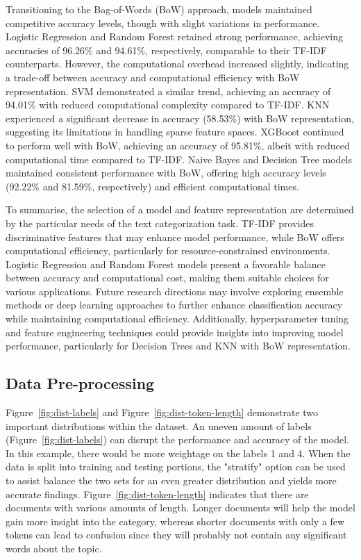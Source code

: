 Transitioning to the Bag-of-Words (BoW) approach, models maintained competitive accuracy levels, though with slight variations in performance. Logistic Regression and Random Forest retained strong performance, achieving accuracies of 96.26\% and 94.61\%, respectively, comparable to their TF-IDF counterparts. However, the computational overhead increased slightly, indicating a trade-off between accuracy and computational efficiency with BoW representation. SVM demonstrated a similar trend, achieving an accuracy of 94.01\% with reduced computational complexity compared to TF-IDF. KNN experienced a significant decrease in accuracy (58.53\%) with BoW representation, suggesting its limitations in handling sparse feature spaces. XGBoost continued to perform well with BoW, achieving an accuracy of 95.81\%, albeit with reduced computational time compared to TF-IDF. Naive Bayes and Decision Tree models maintained consistent performance with BoW, offering high accuracy levels (92.22\% and 81.59\%, respectively) and efficient computational times.

To summarise, the selection of a model and feature representation are determined by the particular needs of the text categorization task. TF-IDF provides discriminative features that may enhance model performance, while BoW offers computational efficiency, particularly for resource-constrained environments. Logistic Regression and Random Forest models present a favorable balance between accuracy and computational cost, making them suitable choices for various applications. Future research directions may involve exploring ensemble methods or deep learning approaches to further enhance classification accuracy while maintaining computational efficiency. Additionally, hyperparameter tuning and feature engineering techniques could provide insights into improving model performance, particularly for Decision Trees and KNN with BoW representation.

\subsection{Data Pre-processing}

Figure~\ref{fig:dist-labels} and Figure~\ref{fig:dist-token-length} demonstrate two important distributions within the dataset. An uneven amount of labels (Figure~\ref{fig:dist-labels}) can disrupt the performance and accuracy of the model. In this example, there would be more weightage on the labels 1 and 4. When the data is split into training and testing portions, the "stratify" option can be used to assist balance the two sets for an even greater distribution and yields more accurate findings. Figure~\ref{fig:dist-token-length} indicates that there are documents with various amounts of length. Longer documents will help the model gain more insight into the category, whereas shorter documents with only a few tokens can lead to confusion since they will probably not contain any significant words about the topic.

